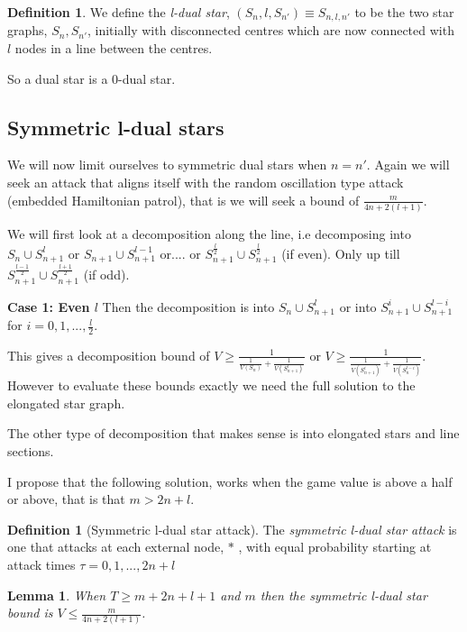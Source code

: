 \documentclass[a4paper,10pt]{article}
\newtheorem{lemma}[theorem]{Lemma}
\theoremstyle{definition}
\newtheorem{definition}[theorem]{Definition}
\theoremstyle{definition}
\theoremstyle{remark}
\theoremstyle{definition}
\begin{document}
\begin{definition}
We define the \textit{l-dual star}, $(S_{n},l,S_{n'}) \equiv S_{n,l,n'}$ to be the two star graphs, $S_{n},S_{n'}$, initially with disconnected centres which are now connected with $l$ nodes in a line between the centres.
\end{definition} 

So a dual star is a 0-dual star.

\subsection{Symmetric l-dual stars}
We will now limit ourselves to symmetric dual stars when $n=n'$. Again we will seek an attack that aligns itself with the random oscillation type attack (embedded Hamiltonian patrol), that is we will seek a bound of $\frac{m}{4n+2(l+1)}$.

We will first look at a decomposition along the line, i.e decomposing into $S_{n} \cup S_{n+1}^{l}$ or $S_{n+1} \cup S_{n+1}^{l-1}$ or.... or $S_{n+1}^{\frac{l}{2}} \cup S_{n+1}^{\frac{l}{2}}$ (if even). Only up till $S_{n+1}^{\frac{l-1}{2}} \cup S_{n+1}^{\frac{l+1}{2}}$ (if odd).

\textbf{Case 1: Even $l$}
Then the decomposition is into $S_{n} \cup S_{n+1}^{l}$ or into $S_{n+1}^{i} \cup S_{n+1}^{l-i}$ for $i=0,1,...,\frac{l}{2}$.

This gives a decomposition bound of $V \geq \frac{1}{\frac{1}{V(S_{n})}+\frac{1}{V(S_{n+1}^{l})}}$ or $V \geq \frac{1}{\frac{1}{V(S_{n+1}^{i})}+\frac{1}{V(S_{n}^{l-i})}}$. However to evaluate these bounds exactly we need the full solution to the elongated star graph.

The other type of decomposition that makes sense is into elongated stars and line sections.

I propose that the following solution, works when the game value is above a half or above, that is that $m > 2n+l$.

\begin{definition}[Symmetric l-dual star attack]
The \textit{symmetric l-dual star attack} is one that attacks at each external node, $*$ , with equal probability starting at attack times $\tau=0,1,...,2n+l$
\end{definition}

\begin{lemma}
When $T \geq m+2n+l+1$ and $m$ then the symmetric l-dual star bound is $V \leq \frac{m}{4n+2(l+1)}$. 
\end{lemma}
\end{document}
